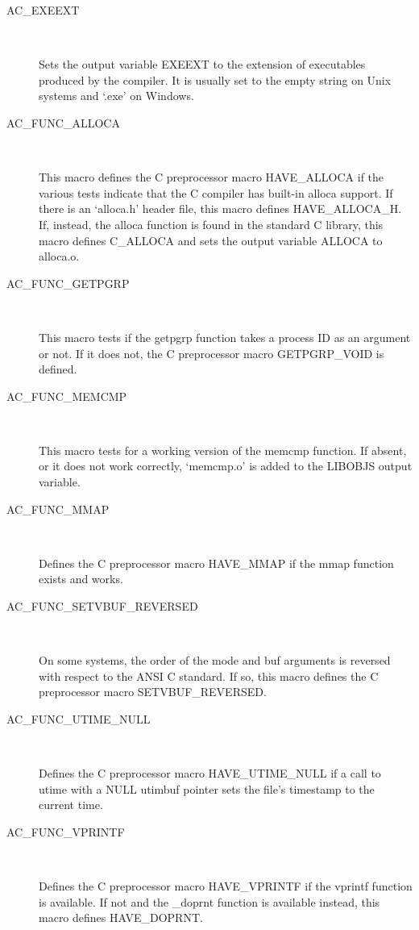\begin{description}
\item[AC\_{}EXEEXT]
\

    Sets the output variable EXEEXT to the extension of executables produced by the compiler. It is usually set to the empty string on Unix systems and `.exe' on Windows.

\item[AC\_{}FUNC\_{}ALLOCA]
\

    This macro defines the C preprocessor macro HAVE\_{}ALLOCA if the various tests indicate that the C compiler has built-in alloca support. If there is an `alloca.h' header file, this macro defines HAVE\_{}ALLOCA\_{}H. If, instead, the alloca function is found in the standard C library, this macro defines C\_{}ALLOCA and sets the output variable ALLOCA to alloca.o.

\item[AC\_{}FUNC\_{}GETPGRP]
\

    This macro tests if the getpgrp function takes a process ID as an argument or not. If it does not, the C preprocessor macro GETPGRP\_{}VOID is defined.

\item[AC\_{}FUNC\_{}MEMCMP]
\

    This macro tests for a working version of the memcmp function. If absent, or it does not work correctly, `memcmp.o' is added to the LIBOBJS output variable.

\item[AC\_{}FUNC\_{}MMAP]
\

    Defines the C preprocessor macro HAVE\_{}MMAP if the mmap function exists and works.

\item[AC\_{}FUNC\_{}SETVBUF\_{}REVERSED]
\

    On some systems, the order of the mode and buf arguments is reversed with respect to the ANSI C standard. If so, this macro defines the C preprocessor macro SETVBUF\_{}REVERSED.

\item[AC\_{}FUNC\_{}UTIME\_{}NULL]
\

    Defines the C preprocessor macro HAVE\_{}UTIME\_{}NULL if a call to utime with a NULL utimbuf pointer sets the file's timestamp to the current time.

\item[AC\_{}FUNC\_{}VPRINTF]
\

    Defines the C preprocessor macro HAVE\_{}VPRINTF if the vprintf function is available. If not and the \_{}doprnt function is available instead, this macro defines HAVE\_{}DOPRNT.


\end{description}
